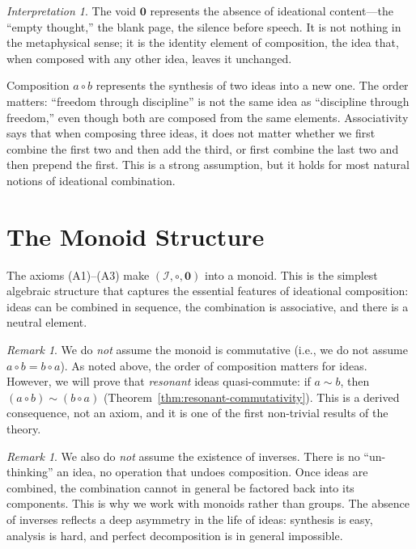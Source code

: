\documentclass[11pt,openany]{book}
\theoremstyle{definition}
\theoremstyle{plain}
\theoremstyle{remark}
\newtheorem{remark}[axiom]{Remark}
\newtheorem{interpretation}[axiom]{Interpretation}
\newcommand{\IS}{\mathcal{I}}               %
\newcommand{\compose}{\circ}                 %
\newcommand{\void}{\mathbf{0}}              %
\newcommand{\res}{\sim}                      %
\begin{document}
\begin{interpretation}
The void $\void$ represents the absence of ideational content---the ``empty thought,'' the blank page, the silence before speech. It is not nothing in the metaphysical sense; it is the identity element of composition, the idea that, when composed with any other idea, leaves it unchanged.

Composition $a \compose b$ represents the synthesis of two ideas into a new one. The order matters: ``freedom through discipline'' is not the same idea as ``discipline through freedom,'' even though both are composed from the same elements. Associativity says that when composing three ideas, it does not matter whether we first combine the first two and then add the third, or first combine the last two and then prepend the first. This is a strong assumption, but it holds for most natural notions of ideational combination.
\end{interpretation}

\section{The Monoid Structure}

The axioms (A1)--(A3) make $(\IS, \compose, \void)$ into a monoid. This is the simplest algebraic structure that captures the essential features of ideational composition: ideas can be combined in sequence, the combination is associative, and there is a neutral element.

\begin{remark}
We do \emph{not} assume the monoid is commutative (i.e., we do not assume $a \compose b = b \compose a$). As noted above, the order of composition matters for ideas. However, we will prove that \emph{resonant} ideas quasi-commute: if $a \res b$, then $(a \compose b) \res (b \compose a)$ (Theorem~\ref{thm:resonant-commutativity}). This is a derived consequence, not an axiom, and it is one of the first non-trivial results of the theory.
\end{remark}

\begin{remark}
We also do \emph{not} assume the existence of inverses. There is no ``un-thinking'' an idea, no operation that undoes composition. Once ideas are combined, the combination cannot in general be factored back into its components. This is why we work with monoids rather than groups. The absence of inverses reflects a deep asymmetry in the life of ideas: synthesis is easy, analysis is hard, and perfect decomposition is in general impossible.
\end{remark}
\end{document}
